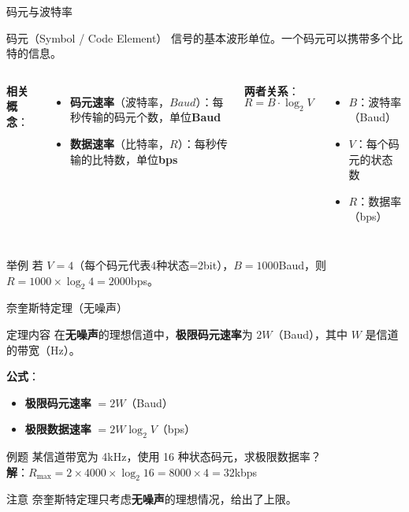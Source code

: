 \documentclass[10pt, aspectratio=169]{beamer}
\begin{document}
\begin{frame}{码元与波特率}
    \begin{block}{码元（Symbol / Code Element）}
        信号的基本波形单位。一个码元可以携带多个比特的信息。
    \end{block}
    \vspace{0.3em}
    \begin{columns}[T]
        \textbf{相关概念}：
        \begin{itemize}
            \item \textbf{码元速率}（波特率，$Baud$）：每秒传输的码元个数，单位\textbf{Baud}
            \item \textbf{数据速率}（比特率，$R$）：每秒传输的比特数，单位\textbf{bps}
        \end{itemize}
        \textbf{两者关系}：
        $$R = B \cdot \log_2 V$$
        \begin{itemize}
            \item $B$：波特率（Baud）
            \item $V$：每个码元的状态数
            \item $R$：数据率（bps）
        \end{itemize}
    \end{columns}
    \vspace{0.5em}
    \begin{exampleblock}{举例}
        若 $V=4$（每个码元代表4种状态=2bit），$B=1000$Baud，则 $R = 1000 \times \log_2 4 = 2000$bps。
    \end{exampleblock}
\end{frame}

\begin{frame}{奈奎斯特定理（无噪声）}
    \begin{block}{定理内容}
        在\textbf{无噪声}的理想信道中，\textbf{极限码元速率}为 $2W$（Baud），其中 $W$ 是信道的带宽（Hz）。
    \end{block}
    \vspace{0.3em}
    \textbf{公式}：
    \begin{itemize}
        \item \textbf{极限码元速率} $= 2W$（Baud）
        \item \textbf{极限数据速率} $= 2W \log_2 V$（bps）
    \end{itemize}
    \vspace{0.5em}
    \begin{exampleblock}{例题}
        某信道带宽为 4kHz，使用 16 种状态码元，求极限数据率？\\
        \textbf{解}：$R_{\max} = 2 \times 4000 \times \log_2 16 = 8000 \times 4 = 32$kbps
    \end{exampleblock}
    \vspace{0.3em}
    \begin{alertblock}{注意}
        奈奎斯特定理只考虑\textbf{无噪声}的理想情况，给出了上限。
    \end{alertblock}
\end{frame}
\end{document}
